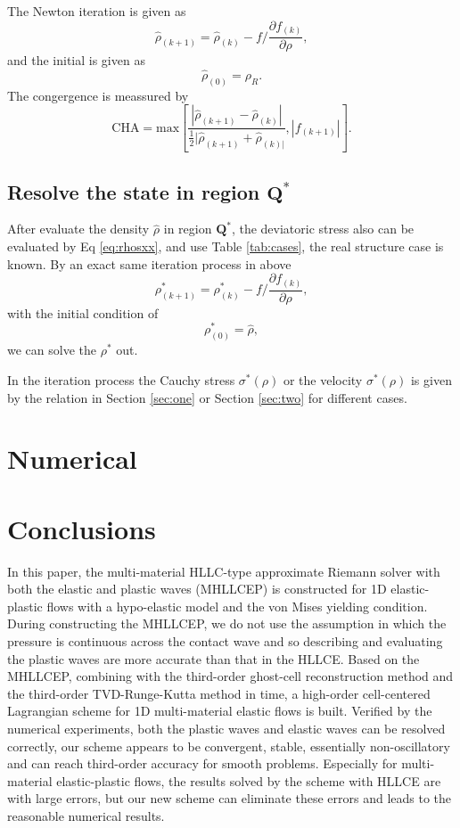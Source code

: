 \documentclass[review]{elsarticle}
\begin{document}
The  Newton iteration is given as
\begin{equation}
  \hat{\rho}_{(k+1)} = \hat{\rho}_{(k)}- f/\frac{\partial f_{(k)}}{\partial \rho},
\end{equation}
and the initial is given as 
\begin{equation}
  \hat{\rho}_{(0)} = \rho_R.
\end{equation}
The  congergence is meassured by
\begin{equation}
  \text{CHA} = \text{max} \left[\frac{|\hat{\rho}_{(k+1)}-\hat{\rho}_{(k)}|}{\frac{1}{2}|\hat{\rho}_{(k+1)}+\hat{\rho}_{(k)|}},|f_{(k+1)}|\right].
\end{equation}
\subsection{Resolve  the state in region $\mathbf{Q}^*$}
After evaluate the density $\hat{\rho}$ in region $\mathbf{Q}^*$,   the deviatoric stress also can be evaluated by Eq \ref{eq:rhosxx}, and use Table  \ref{tab:cases}, the real structure case is known. By  an exact same iteration process in above   
\begin{equation}
 \rho^*_{(k+1)} = \rho^*_{(k)}- f/\frac{\partial f_{(k)}}{\partial \rho},
\end{equation}
with the initial condition of 
\begin{equation}
  \rho^*_{(0)} = \hat{\rho},
\end{equation}
we can solve the $\rho^*$ out. 

In the iteration process the Cauchy stress $\sigma^*(\rho)$ or the velocity $\sigma^*(\rho)$ is given by the relation in Section \ref{sec:one} or Section \ref{sec:two} for different cases.
\section{Numerical }
%
\section*{Conclusions}
In this paper,  the multi-material HLLC-type  approximate Riemann solver with both the elastic and plastic waves (MHLLCEP) is constructed for 1D elastic-plastic  flows with a hypo-elastic model and the von Mises yielding condition. During constructing the  MHLLCEP, we do not use the assumption in which the pressure is continuous across the contact wave and so describing and evaluating the plastic waves are  more accurate than that in the  HLLCE.  Based on the MHLLCEP,
combining with the third-order ghost-cell reconstruction method and the third-order TVD-Runge-Kutta method in time, a high-order cell-centered Lagrangian scheme for 1D multi-material elastic flows is built. Verified by the numerical experiments, both the plastic waves and elastic waves can be resolved correctly, our scheme appears to be convergent, stable, essentially non-oscillatory and can reach third-order accuracy for smooth problems. Especially for multi-material elastic-plastic flows, the results solved by the scheme with HLLCE are with large errors, but our new scheme can eliminate these errors and leads to the reasonable numerical results.
\end{document}
